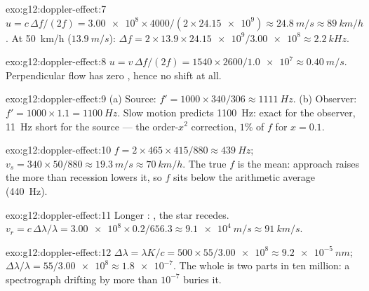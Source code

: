\begin{solution}{exo:g12:doppler-effect:7}
$u = c\,\Delta f/(2f) = \num{3.00e8} \times 4000/(2 \times \num{24.15e9}) \approx
\qty{24.8}{m/s} \approx \qty{89}{km/h}$. At \qty{50}{km/h} ($\qty{13.9}{m/s}$):
$\Delta f = 2 \times 13.9 \times \num{24.15e9}/\num{3.00e8} \approx \qty{2.2}{kHz}$.
\end{solution}

\begin{solution}{exo:g12:doppler-effect:8}
$u = v\,\Delta f/(2f) = 1540 \times 2600/\num{1.0e7} \approx \qty{0.40}{m/s}$.
Perpendicular flow has zero , hence no shift at all.
\end{solution}

\begin{solution}{exo:g12:doppler-effect:9}
(a) Source: $f' = 1000 \times 340/306 \approx \qty{1111}{Hz}$. (b) Observer:
$f' = 1000 \times 1.1 = \qty{1100}{Hz}$. Slow motion predicts \qty{1100}{Hz}: exact for
the observer, \qty{11}{Hz} short for the source --- the order-$x^2$ correction, $1\%$ of
$f$ for $x = 0.1$.
\end{solution}

\begin{solution}{exo:g12:doppler-effect:10}
$f = 2 \times 465 \times 415/880 \approx \qty{439}{Hz}$;
$v_s = 340 \times 50/880 \approx \qty{19.3}{m/s} \approx \qty{70}{km/h}$. The true $f$
is the  mean: approach raises the  more than recession lowers it, so
$f$ sits below the arithmetic average (\qty{440}{Hz}).
\end{solution}

\begin{solution}{exo:g12:doppler-effect:11}
Longer : , the star recedes. $v_r = c\,\Delta\lambda/\lambda =
\num{3.00e8} \times 0.2/656.3 \approx \qty{9.1e4}{m/s} \approx \qty{91}{km/s}$.
\end{solution}

\begin{solution}{exo:g12:doppler-effect:12}
$\Delta\lambda = \lambda K/c = 500 \times 55/\num{3.00e8} \approx \qty{9.2e-5}{nm}$;
$\Delta\lambda/\lambda = 55/\num{3.00e8} \approx \num{1.8e-7}$. The whole  is two
parts in ten million: a spectrograph drifting by more than $10^{-7}$ buries it.
\end{solution}

